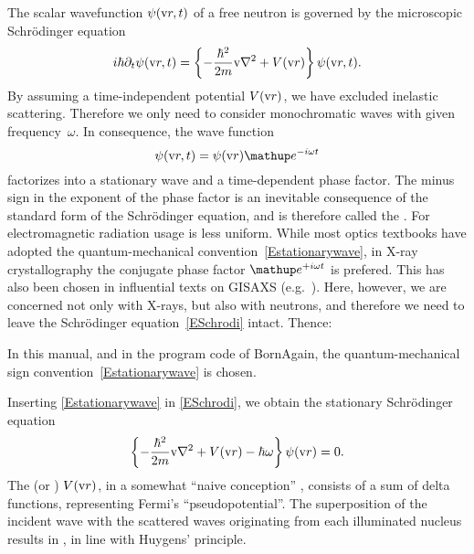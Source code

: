\def\Vmac{\tilde{V}}

%
The scalar wavefunction $\psi(\text{v}{r},t)$
%
%
%
of a free neutron
is governed by the microscopic Schrödinger equation
\begin{equation}\label{ESchrodi}
  i\hbar\partial_t \psi(\text{v}{r},t)
  = \left\{-\frac{\hbar^2}{2m}\text{v}{\nabla}^2+V(\text{v}{r})\right\} \psi(\text{v}{r},t).
\end{equation}
By assuming a time-independent potential $V(\text{v}{r})$,
we have excluded inelastic scattering.
Therefore we only need to consider monochromatic waves
%
%
with given frequency~$\omega$.
%
In consequence, the wave function
\begin{equation}\label{Estationarywave}
  \psi(\r,t) = \psi(\r)\e^{-i\omega t}
\end{equation}
%
factorizes into a stationary wave and a time-dependent phase factor.
The minus sign in the exponent of the phase factor
is an inevitable consequence of the standard form of the Schrödinger equation,
and is therefore called the .
%
%
%
For electromagnetic radiation
usage is less uniform.
While most optics textbooks
have adopted the quantum-mechanical convention~\cref{Estationarywave},
in X-ray crystallography
the conjugate phase factor $\e^{+i\omega t}$ is prefered.
This  has also been chosen
in influential texts on GISAXS (e.g.\ \cite{ReLL09}).
Here, however, we are concerned not only with X-rays,
but also with neutrons,
and therefore we need to leave the Schrödinger equation~\cref{ESchrodi} intact.
Thence:

\Note
{\indent In this manual, and in the program code of BornAgain,
the quantum-mechanical sign convention~\cref{Estationarywave} is chosen.}
%

Inserting \cref{Estationarywave} in \cref{ESchrodi},
we obtain the stationary Schrödinger equation
\begin{equation}\label{EstatSchrodi}
  \left\{-\frac{\hbar^2}{2m}\text{v}{\nabla}^2+V(\text{v}{r})-\hbar\omega\right\} \psi(\text{v}{r}) = 0.
\end{equation}
%
%
%
%
The  (or )
 $V(\text{v}{r})$,
in a somewhat ``naive conception'' \cite[p.~7]{Sea89},
consists of a sum of delta functions,
representing Fermi's ``pseudopotential''.
%
The superposition of the incident wave with the scattered waves
originating from each illuminated nucleus
results in ,
%
in line with Huygens' principle.
%

